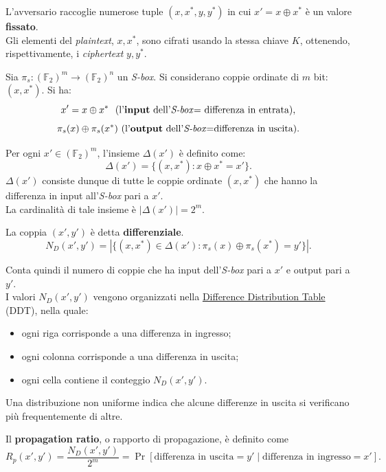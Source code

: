\vspace{1em} \noindent  L'avversario raccoglie numerose tuple $(x,x^*, y, y^*)$ in cui $x'=x\oplus x^*$ è un valore \textbf{fissato}. \\Gli elementi del \textit{plaintext}, $x, x^*$, sono cifrati usando la stessa chiave $K$, ottenendo, rispettivamente, i \textit{ciphertext} $y, y^*$. 

\vspace{1em}  \noindent 
Sia $\pi_s:(\mathbb{F}_2)^m \to (\mathbb{F}_2)^n$ un \textit{S-box}. 
Si considerano coppie ordinate di $m$ bit: $(x, x^*)$. Si ha:
\[x'=x \oplus x^*  \ \text{ (l'\textbf{input} dell'\textit{S-box}= differenza in entrata)},
\]
\[\pi_s(x) \oplus \pi_s(x^*) \ \text{(l'\textbf{output} dell'\textit{S-box}=differenza in uscita)}.
\]


\vspace{1em} \noindent 
Per ogni $x' \in (\mathbb{F}_2)^m$, l'insieme $\Delta(x')$ è definito come:
\[
\Delta(x') = \{(x, x^*) : x \oplus x^* = x'\}.
\]
$\Delta(x')$ consiste dunque di tutte le coppie ordinate $(x, x^*)$ che hanno la differenza in input all'\textit{S-box} pari a $x'$. \\ La cardinalità di tale insieme è $|\Delta(x')|=2^m$. 


\vspace{1em} \noindent  La coppia $(x',y')$ è detta \textbf{differenziale}.
\[
    N_D(x',y')=|\{(x,x^*) \in \Delta(x'):\pi_s(x) \oplus \pi_s(x^*)=y'\}|. 
\]

\noindent Conta quindi il numero di coppie che ha input dell'\textit{S-box} pari a $x'$ e output pari a $y'$.\\ I valori $N_D(x',y')$ vengono organizzati nella \underline{Difference Distribution Table} (DDT), nella quale:
\begin{itemize}
    \item ogni riga corrisponde a una differenza in ingresso;
    \item ogni colonna corrisponde a una differenza in uscita;
    \item ogni cella contiene il conteggio $N_D(x',y')$.
\end{itemize}

\noindent Una distribuzione non uniforme indica che alcune differenze in uscita si verificano più frequentemente di altre. 

\vspace{1em}\noindent Il \textbf{propagation ratio}, o rapporto di propagazione, è definito come
\[
R_p(x',y') = \frac{N_D(x',y')}{2^m} =
\Pr\left[
\text{differenza in uscita}=y'
\mid
\text{differenza in ingresso}=x'
\right]
.
\]

